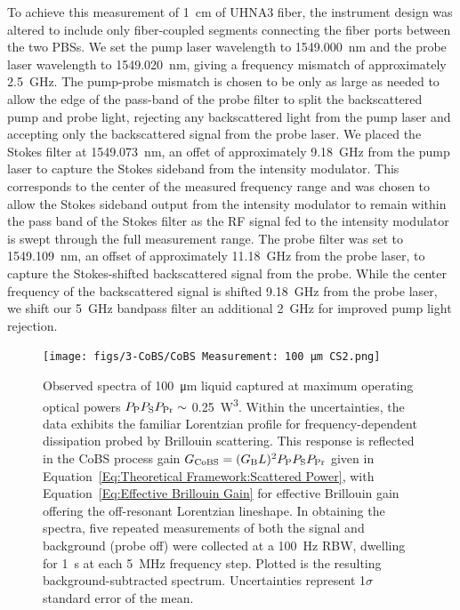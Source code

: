 To achieve this measurement of \SI{1}{\centi\meter} of \ac{UHNA3} fiber, the instrument design was altered to include only fiber-coupled segments connecting the fiber ports between the two \ac{PBS}s. We set the pump laser wavelength to \SI{1549.000}{\nano\meter} and the probe laser wavelength to \SI{1549.020}{\nano\meter}, giving a frequency mismatch of approximately \SI{2.5}{\giga\hertz}. The pump-probe mismatch is chosen to be only as large as needed to allow the edge of the pass-band of the probe filter to split the backscattered pump and probe light, rejecting any backscattered light from the pump laser and accepting only the backscattered signal from the probe laser. We placed the Stokes filter at \SI{1549.073}{\nano\meter}, an offet of approximately \SI{9.18}{\giga\hertz} from the pump laser to capture the Stokes sideband from the intensity modulator. This corresponds to the center of the measured frequency range and was chosen to allow the Stokes sideband output from the intensity modulator to remain within the pass band of the Stokes filter as the RF signal fed to the intensity modulator is swept through the full measurement range. The probe filter was set to \SI{1549.109}{\nano\meter}, an offset of approximately \SI{11.18}{\giga\hertz} from the probe laser, to capture the Stokes-shifted backscattered signal from the probe. While the center frequency of the backscattered signal is shifted \SI{9.18}{\giga\hertz} from the probe laser, we shift our \SI{5}{\giga\hertz} bandpass filter an additional \SI{2}{\giga\hertz} for improved pump light rejection.

\begin{figure}[t!]
  \centering
  \hspace{-2em}\texttt{[image: figs/3-CoBS/CoBS Measurement: 100 μm CS2.png]}
  \caption[Observed spectra of \SI{100}{\micro\meter} liquid  captured at maximum operating optical powers.]{Observed spectra of \SI{100}{\micro\meter} liquid  captured at maximum operating optical powers \(P_{\rm P}P_{\rm S}P_{\rm Pr} \sim\) \SI{0.25}{\cubic\watt}. Within the uncertainties, the data exhibits the familiar Lorentzian profile for frequency-dependent dissipation probed by Brillouin scattering. This response is reflected in the \ac{CoBS} process gain \(G_{\rm CoBS} = (G_{\rm B}L)^{2}P_{\rm P}P_{\rm S}P_{\rm Pr}\) given in Equation~\ref{Eq:Theoretical Framework:Scattered Power}, with Equation~\ref{Eq:Effective Brillouin Gain} for effective Brillouin gain offering the off-resonant Lorentzian lineshape. In obtaining the spectra, five repeated measurements of both the signal and background (probe off) were collected at a \SI{100}{\hertz} \ac{RBW}, dwelling for \SI{1}{\second} at each \SI{5}{\mega\hertz} frequency step. Plotted is the resulting background-subtracted spectrum. Uncertainties represent 1\(\sigma\) standard error of the mean.}
  \label{fig:100umCS2}
\end{figure}

